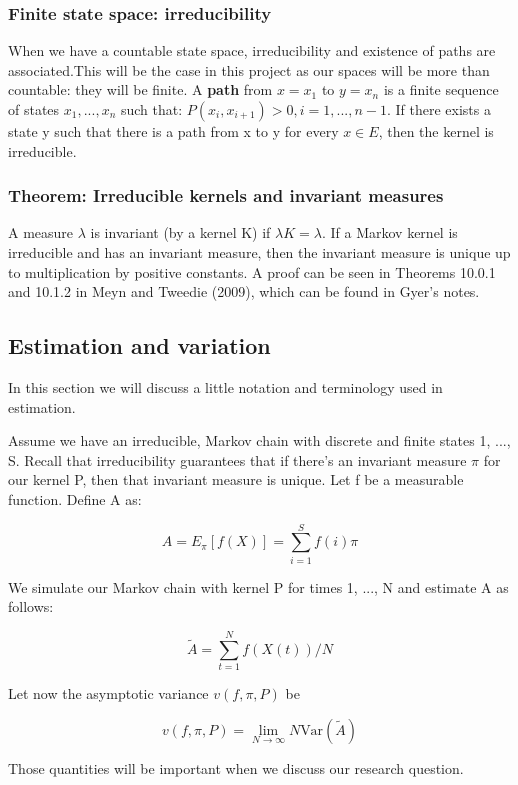 \subsubsection{Finite state space: irreducibility}
When we have a countable state space, irreducibility and existence of paths are associated.This will be the case in this project as our spaces will be more than countable: they will be finite. A \textbf{path} from $x = x_1$ to $y = x_n$ is a finite sequence of states $x_1, ..., x_n$ such that:
$ P (x_i, x_{i+1}) > 0, i = 1, ... , n - 1$.
If there exists a state y such that there is a path from x to y for every $x \in E$, then the kernel is irreducible.

\subsubsection{Theorem: Irreducible kernels and invariant measures}
A measure $\lambda$ is invariant (by a kernel K) if $\lambda K = \lambda$. If a Markov kernel is irreducible and has an invariant measure, then the invariant measure is unique up to multiplication by positive constants. A proof can be seen in Theorems 10.0.1 and 10.1.2 in Meyn and Tweedie (2009), which can be found in Gyer's notes.


\subsection{Estimation and variation}
In this section we will discuss a little notation and terminology used in estimation.

Assume we have an irreducible, Markov chain with discrete and finite states 1, ..., S. Recall that irreducibility guarantees that if there's an invariant measure $\pi$ for our kernel P, then that invariant measure is unique. Let f be a measurable function. Define A as:

\[
A = E_{\pi}[f(X)] =  \sum_{i=1}^S f(i) \pi
\]

We simulate our Markov chain with kernel P for times 1, ..., N and estimate A as follows:

\[
\tilde{A} = \sum_{t=1}^N f(X(t)) / N
\]

Let now the asymptotic variance $v(f, \pi, P)$ be

\[
v(f, \pi, P) = \lim_{N \rightarrow \infty } N \text{Var}(\tilde{A})
\]

Those quantities will be important when we discuss our research question.